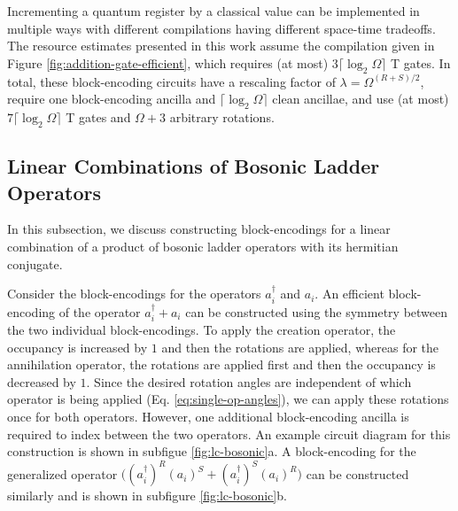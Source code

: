 Incrementing a quantum register by a classical value can be implemented in multiple ways with different compilations having different space-time tradeoffs.
The resource estimates presented in this work assume the compilation given in Figure \ref{fig:addition-gate-efficient}, which requires (at most) $3 \lceil \log_2 \Omega \rceil$ T gates.
In total, these block-encoding circuits have a rescaling factor of $\lambda = \Omega^{(R+S)/2}$, require one block-encoding ancilla and $\lceil{\log_2{\Omega}}\rceil$ clean ancillae, and use (at most) $7 \lceil \log_2 \Omega \rceil$ T gates and $\Omega + 3$ arbitrary rotations.


\subsection{Linear Combinations of Bosonic Ladder Operators}

In this subsection, we discuss constructing block-encodings for a linear combination of a product of bosonic ladder operators with its hermitian conjugate.


\begin{figure*}
    
    
    \caption{
        \textbf{Block-Encoding Product of Bosonic Ladder Operators Plus Hermitian Conjugate}
        In (a), a block-encoding for the operator $(a_i^\dagger + a_i)$ is given.
        In (b), a block-encoding for the operator $\big((a_i^\dagger)^R (a_i)^S + (a_i^\dagger)^S (a_i)^R\big)$ is given.
    }
    \label{fig:lc-bosonic}
\end{figure*}


Consider the block-encodings for the operators $a_i^\dagger$ and $a_i$.
An efficient block-encoding of the operator $a_i^\dagger + a_i$ can be constructed using the symmetry between the two individual block-encodings. 
To apply the creation operator, the occupancy is increased by $1$ and then the rotations are applied, whereas for the annihilation operator, the rotations are applied first and then the occupancy is decreased by $1$.
Since the desired rotation angles are independent of which operator is being applied (Eq. \ref{eq:single-op-angles}), we can apply these rotations once for both operators.
However, one additional block-encoding ancilla is required to index between the two operators.
An example circuit diagram for this construction is shown in subfigue \ref{fig:lc-bosonic}a.
A block-encoding for the generalized operator $\big((a_i^\dagger)^R (a_i)^S + (a_i^\dagger)^S (a_i)^R\big)$ can be constructed similarly and is shown in subfigure \ref{fig:lc-bosonic}b.

